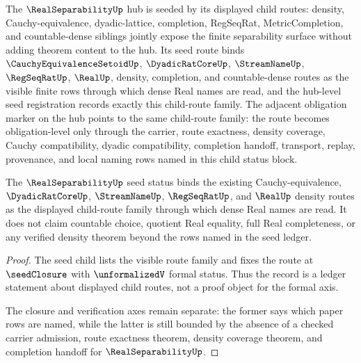 The $\RealSeparabilityUp$ hub is seeded by its displayed child routes: density, Cauchy-equivalence, dyadic-lattice, completion, RegSeqRat, MetricCompletion, and countable-dense siblings jointly expose the finite separability surface without adding theorem content to the hub. Its seed route binds $\CauchyEquivalenceSetoidUp$, $\DyadicRatCoreUp$, $\StreamNameUp$, $\RegSeqRatUp$, $\RealUp$, density, completion, and countable-dense routes as the visible finite rows through which dense Real names are read, and the hub-level seed registration records exactly this child-route family. The adjacent obligation marker on the hub points to the same child-route family: the route becomes obligation-level only through the carrier, route exactness, density coverage, Cauchy compatibility, dyadic compatibility, completion handoff, transport, replay, provenance, and local naming rows named in this child status block.

\begin{theorem}\label{thm:real-separability-seed-status}\label{thm:real-separability-seed-closure-status}
The $\RealSeparabilityUp$ seed status binds the existing Cauchy-equivalence, $\DyadicRatCoreUp$, $\StreamNameUp$, $\RegSeqRatUp$, and $\RealUp$ density routes as the displayed child-route family through which dense Real names are read. It does not claim countable choice, quotient Real equality, full Real completeness, or any verified density theorem beyond the rows named in the seed ledger.
\end{theorem}

\begin{proof}
The seed child lists the visible route family and fixes the route at $\seedClosure$ with $\unformalizedV$ formal status. Thus the record is a ledger statement about displayed child routes, not a proof object for the formal axis.

The closure and verification axes remain separate: the former says which paper rows are named, while the latter is still bounded by the absence of a checked carrier admission, route exactness theorem, density coverage theorem, and completion handoff for $\RealSeparabilityUp$.
\end{proof}

